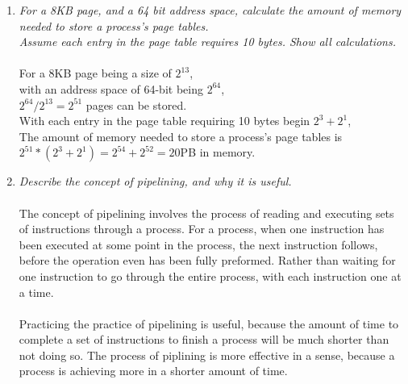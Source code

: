 \documentclass[letterpaper,10pt,onecolumn,compsoc]{IEEEtran}
\begin{document}
\begin{enumerate}
\bigskip
\item \textit{For a 8KB page, and a 64 bit address space, calculate the amount of memory needed to store a process's page tables. \\Assume each entry in the page table requires 10 bytes. Show all calculations.}
\\ ~ \\
For a 8KB page being a size of $2^{13}$, \\
with an address space of 64-bit being $2^{64}$, \\
$2^{64}/2^{13} = 2^{51}$ pages can be stored. \\
With each entry in the page table requiring 10 bytes begin $2^{3} + 2^{1}$, \\
The amount of memory needed to store a process's page tables is \\
$2^{51}*(2^{3} + 2^{1}) = 2^{54} + 2^{52} = 20$PB in memory.


\bigskip
\item \textit{Describe the concept of pipelining, and why it is useful.}
\\ ~ \\
The concept of pipelining involves the process of reading and executing sets of instructions through a process. For a process, when one instruction has been executed at some point in the process, the next instruction follows, before the operation even has been fully preformed. Rather than waiting for one instruction to go through the entire process, with each instruction one at a time. 
\\ ~ \\
Practicing the practice of pipelining is useful, because the amount of time to complete a set of instructions to finish a process will be much shorter than not doing so. The process of piplining is more effective in a sense, because a process is achieving more in a shorter amount of time.

\newpage


\end{enumerate}
\end{document}
